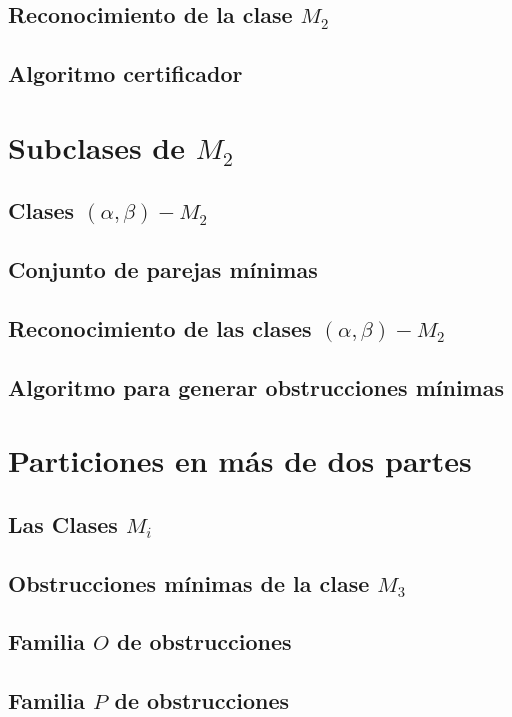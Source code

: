     \subsection{Reconocimiento de la clase $M_2$}
        

    \subsection{Algoritmo certificador}
        

\section{Subclases de $M_2$}

    \subsection{Clases $(\alpha, \beta)-M_2$}

    \subsection{Conjunto de parejas mínimas}

    \subsection{Reconocimiento de las clases $(\alpha, \beta)-M_2$}

    \subsection{Algoritmo para generar obstrucciones mínimas}

\section{Particiones en más de dos partes}
    \subsection{Las Clases $M_i$}

    \subsection{Obstrucciones mínimas de la clase $M_3$}
        

    \subsection{Familia $O$ de obstrucciones}

    \subsection{Familia $P$ de obstrucciones}
